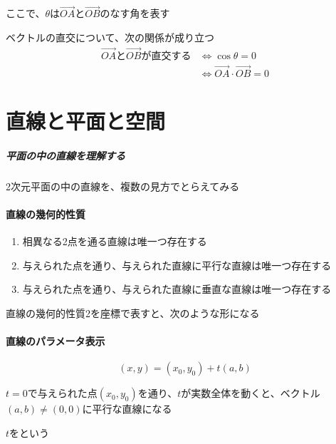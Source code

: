 \documentclass[../book_jiriki_calc]{subfiles}
\begin{document}
ここで、$\theta$は$\overrightarrow{OA}$と$\overrightarrow{OB}$のなす角を表す

\sectionline

ベクトルの直交について、次の関係が成り立つ
\begin{align*}
  \overrightarrow{OA}\text{と}\overrightarrow{OB}\text{が直交する}
   & \Longleftrightarrow \cos\theta = 0                                  \\
   & \Longleftrightarrow \overrightarrow{OA}\cdot\overrightarrow{OB} = 0
\end{align*}

\section{直線と平面と空間}

\subparagraph{平面の中の直線を理解する}\quad

2次元平面の中の直線を、複数の見方でとらえてみる

\sectionline

\paragraph{直線の幾何的性質}

\begin{enumerate}
  \item 相異なる2点を通る直線は唯一つ存在する
  \item 与えられた点を通り、与えられた直線に平行な直線は唯一つ存在する
  \item 与えられた点を通り、与えられた直線に垂直な直線は唯一つ存在する
\end{enumerate}

\sectionline

直線の幾何的性質2を座標で表すと、次のような形になる

\br

\paragraph{直線のパラメータ表示}

\begin{equation*}
  (x,y) = (x_0,y_0) + t(a,b)
\end{equation*}

\br

$t=0$で与えられた点$(x_0,y_0)$を通り、$t$が実数全体を動くと、ベクトル$(a,b)\neq (0,0)$に平行な直線になる

$t$をという
\end{document}
